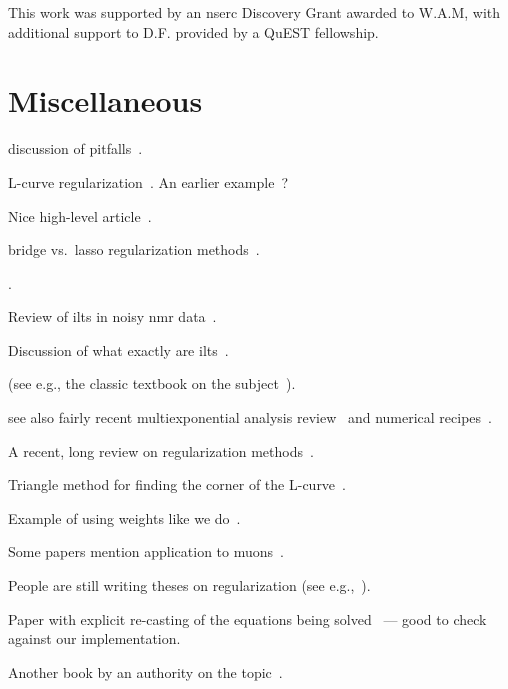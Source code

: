 \documentclass[
  aps,
  prb,
  twocolumn,
  reprint,
  superscriptaddress,
  floatfix,
  citeautoscript,
  longbibliography,
]{revtex4-2}
\newcommand{\latin}[1]{#1}
\begin{document}
\begin{acknowledgments}
This work was supported by an \gls{nserc} Discovery Grant awarded to W.A.M,
with additional support to D.F. provided by a QuEST fellowship.
\end{acknowledgments}


\appendix

\section{Miscellaneous \label{sec:miscellaneous}}

discussion of pitfalls~\cite{1983-Varah-SIAMJSSC-4-164}.

L-curve regularization~\cite{1992-Hansen-SIAMR-34-561, 1993-Hansen-SIAMJSC-14-1487}.
An earlier example~\cite{1990-Hansen-SIAMJSSC-11-503}?

Nice high-level article~\cite{1994-Craig-CP-8-648}.

bridge vs.\ lasso regularization methods~\cite{1998-Wenjiang-JCGS-7-397}.

\cite{2002-Venkataramanan-IEEETSP-50-1017}.

Review of \glspl{ilt} in noisy \gls{nmr} data~\cite{2013-Berman-CMRPA-42-72}.

Discussion of what exactly are \glspl{ilt}~\cite{2017-Fordham-DF-29-2}.

(see \latin{e.g.}, the classic textbook on the subject~\cite{1995-Lawson-SLSP}).

see also fairly recent multiexponential analysis review~\cite{1999-Istratov-RSI-70-1233} and numerical recipes~\cite{numerical-recipies}.

A recent, long review on regularization methods~\cite{2018-Benning-AN-27-1}.

Triangle method for finding the corner of the L-curve~\cite{2002-Castellanos-ANM-43-359}.

Example of using weights like we do~\cite{1999-Dunn-JMR-140-153}.

Some papers mention application to muons~\cite{1984-Honig-JCAM-10-113}.

People are still writing theses on regularization (see \latin{e.g.},~\cite{2011-OrozcoRodriguez-PhD}).

Paper with explicit re-casting of the equations being solved~\cite{2001-OLeary-SIAMJSC-23-1161} --- good to check against our implementation.

Another book by an authority on the topic~\cite{1998-Hansen-RDDIPP}.



\end{document}
